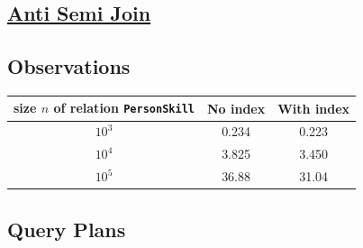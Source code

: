 \documentclass{article}
\begin{document}
    \subsection*{\underline{Anti Semi Join}}
    \subsection*{Observations}
    \begin{center}
      {\normalsize
        \begin{tabular}{c|c|c}
        size $n$ of relation {\tt PersonSkill} & No index & With index \\ \hline
        $10^3$ & 0.234 &  0.223 \\
        $10^4$ & 3.825 & 3.450 \\
        $10^5$ & 36.88 &  31.04 \\
        \end{tabular}
      }
      \end{center}
    \subsection*{Query Plans}
\end{document}
